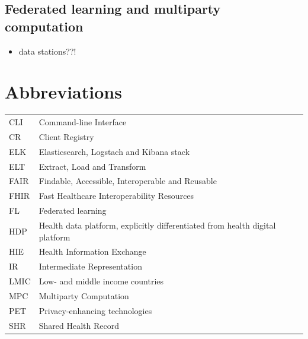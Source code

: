\documentclass[
  authoryear]{elsarticle}
\providecommand{\tightlist}{%
  \setlength{\itemsep}{0pt}\setlength{\parskip}{0pt}}\usepackage{longtable,booktabs,array}
\begin{document}
\subsection{Federated learning and multiparty
computation}\label{federated-learning-and-multiparty-computation}

\begin{itemize}
\tightlist
\item
  data stations??!
\end{itemize}

\section{Abbreviations}\label{abbreviations}

\begin{longtable}[]{@{}
  >{\raggedright\arraybackslash}p{}
  >{\raggedright\arraybackslash}p{}@{}}
\toprule\noalign{}
\endhead
\bottomrule\noalign{}
\endlastfoot
CLI & Command-line Interface \\
CR & Client Registry \\
ELK & Elasticsearch, Logstach and Kibana stack \\
ELT & Extract, Load and Transform \\
FAIR & Findable, Accessible, Interoperable and Reusable \\
FHIR & Fast Healthcare Interoperability Resources \\
FL & Federated learning \\
HDP & Health data platform, explicitly differentiated from health
digital platform \\
HIE & Health Information Exchange \\
IR & Intermediate Representation \\
LMIC & Low- and middle income countries \\
MPC & Multiparty Computation \\
PET & Privacy-enhancing technologies \\
SHR & Shared Health Record \\
\end{longtable}


  
\end{document}
